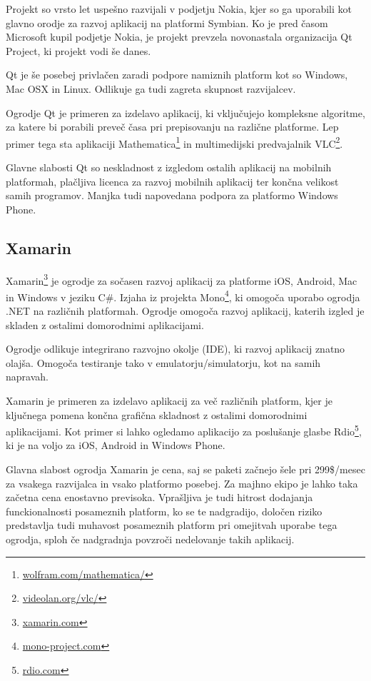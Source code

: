 Projekt so vrsto let uspešno razvijali v podjetju Nokia, kjer so ga uporabili kot glavno orodje za razvoj aplikacij na platformi Symbian. Ko je pred časom Microsoft kupil podjetje Nokia, je projekt prevzela novonastala organizacija Qt Project, ki projekt vodi še danes.

Qt je še posebej privlačen zaradi podpore namiznih platform kot so Windows, Mac OSX in Linux. Odlikuje ga tudi zagreta skupnost razvijalcev.

Ogrodje Qt je primeren za izdelavo aplikacij, ki vključujejo kompleksne algoritme, za katere bi porabili preveč časa pri prepisovanju na različne platforme. Lep primer tega sta aplikaciji Mathematica\footnote{\href{http://www.wolfram.com/mathematica/}{wolfram.com/mathematica/}} in multimedijski predvajalnik VLC\footnote{\href{http://www.videolan.org/vlc/}{videolan.org/vlc/}}.

Glavne slabosti Qt so neskladnost z izgledom ostalih aplikacij na mobilnih platformah, plačljiva licenca za razvoj mobilnih aplikacij ter končna velikost samih programov. Manjka tudi napovedana podpora za platformo Windows Phone.

\subsection{Xamarin}

Xamarin\footnote{\href{https://xamarin.com}{xamarin.com}} je ogrodje za sočasen razvoj aplikacij za platforme iOS, Android, Mac in Windows v jeziku C\#. Izjaha iz projekta Mono\footnote{\href{http://www.mono-project.com}{mono-project.com}}, ki omogoča uporabo ogrodja .NET na različnih platformah. Ogrodje omogoča razvoj aplikacij, katerih izgled je skladen z ostalimi domorodnimi aplikacijami.

Ogrodje odlikuje integrirano razvojno okolje (IDE), ki razvoj aplikacij znatno olajša. Omogoča testiranje tako v emulatorju/simulatorju, kot na samih napravah.

Xamarin je primeren za izdelavo aplikacij za več različnih platform, kjer je ključnega pomena končna grafična skladnost z ostalimi domorodnimi aplikacijami. Kot primer si lahko ogledamo aplikacijo za poslušanje glasbe Rdio\footnote{\href{https://www.rdio.com}{rdio.com}}, ki je na voljo za iOS, Android in Windows Phone.

Glavna slabost ogrodja Xamarin je cena, saj se paketi začnejo šele pri 299\$/mesec za vsakega razvijalca in vsako platformo posebej. Za majhno ekipo je lahko taka začetna cena enostavno previsoka. Vprašljiva je tudi hitrost dodajanja funckionalnosti posameznih platform, ko se te nadgradijo, določen riziko predstavlja tudi muhavost posameznih platform pri omejitvah uporabe tega ogrodja, sploh če nadgradnja povzroči nedelovanje takih aplikacij.


